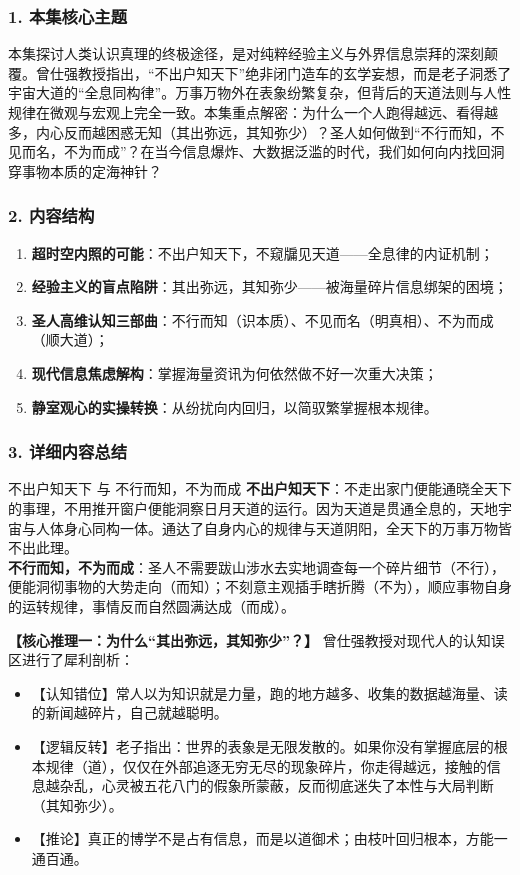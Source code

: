 \subsubsection{1. 本集核心主题}
本集探讨人类认识真理的终极途径，是对纯粹经验主义与外界信息崇拜的深刻颠覆。曾仕强教授指出，“不出户知天下”绝非闭门造车的玄学妄想，而是老子洞悉了宇宙大道的“全息同构律”。万事万物外在表象纷繁复杂，但背后的天道法则与人性规律在微观与宏观上完全一致。本集重点解密：为什么一个人跑得越远、看得越多，内心反而越困惑无知（其出弥远，其知弥少）？圣人如何做到“不行而知，不见而名，不为而成”？在当今信息爆炸、大数据泛滥的时代，我们如何向内找回洞穿事物本质的定海神针？

\subsubsection{2. 内容结构}
\begin{enumerate}
    \item \textbf{超时空内照的可能}：不出户知天下，不窥牖见天道——全息律的内证机制；
    \item \textbf{经验主义的盲点陷阱}：其出弥远，其知弥少——被海量碎片信息绑架的困境；
    \item \textbf{圣人高维认知三部曲}：不行而知（识本质）、不见而名（明真相）、不为而成（顺大道）；
    \item \textbf{现代信息焦虑解构}：掌握海量资讯为何依然做不好一次重大决策；
    \item \textbf{静室观心的实操转换}：从纷扰向内回归，以简驭繁掌握根本规律。
\end{enumerate}

\subsubsection{3. 详细内容总结}

\begin{ConceptBox}{不出户知天下 与 不行而知，不为而成}
\textbf{不出户知天下}：不走出家门便能通晓全天下的事理，不用推开窗户便能洞察日月天道的运行。因为天道是贯通全息的，天地宇宙与人体身心同构一体。通达了自身内心的规律与天道阴阳，全天下的万事万物皆不出此理。\\
\textbf{不行而知，不为而成}：圣人不需要跋山涉水去实地调查每一个碎片细节（不行），便能洞彻事物的大势走向（而知）；不刻意主观插手瞎折腾（不为），顺应事物自身的运转规律，事情反而自然圆满达成（而成）。
\end{ConceptBox}

\noindent\textbf{【核心推理一：为什么“其出弥远，其知弥少”？】}
曾仕强教授对现代人的认知误区进行了犀利剖析：
\begin{itemize}
    \item 【认知错位】常人以为知识就是力量，跑的地方越多、收集的数据越海量、读的新闻越碎片，自己就越聪明。
    \item 【逻辑反转】老子指出：世界的表象是无限发散的。如果你没有掌握底层的根本规律（道），仅仅在外部追逐无穷无尽的现象碎片，你走得越远，接触的信息越杂乱，心灵被五花八门的假象所蒙蔽，反而彻底迷失了本性与大局判断（其知弥少）。
    \item 【推论】真正的博学不是占有信息，而是以道御术；由枝叶回归根本，方能一通百通。
\end{itemize}

